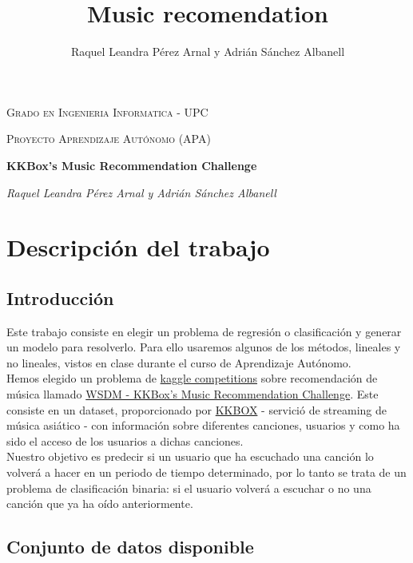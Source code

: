 \documentclass[a4paper]{article}
\title{Music recomendation}
\author{Raquel Leandra Pérez Arnal y Adrián Sánchez Albanell}
\date{} %
\begin{document}
\begin{titlepage}
	\centering
	{\scshape\LARGE Grado en Ingenieria Informatica - UPC \par}
	\vspace{1cm}
	{\scshape\Large Proyecto Aprendizaje Autónomo (APA)\par}
	\vspace{1.5cm}
	{\huge\bfseries KKBox's Music Recommendation Challenge\par}
	\vspace{2cm}
	{\Large\itshape Raquel Leandra Pérez Arnal y Adrián Sánchez Albanell\par}
\end{titlepage}
\clearpage
{\hypersetup{linkcolor=black}
\tableofcontents
}
\cleardoublepage

\section{Descripción del trabajo}


\subsection{Introducción}

Este trabajo consiste en elegir un problema de regresión o clasificación y generar un modelo para resolverlo. Para ello usaremos algunos de los métodos, lineales y no lineales, vistos en clase durante el curso de Aprendizaje Autónomo.\\

Hemos elegido un problema de \href{https://www.kaggle.com/competitions}{kaggle competitions} sobre recomendación de música llamado \href{https://www.kaggle.com/c/kkbox-music-recommendation-challenge}{WSDM - KKBox's Music Recommendation Challenge}. Este consiste en un dataset, proporcionado por \href{https://www.kkbox.com/intl/index.php?area=intl}{KKBOX} - servició de streaming de música asiático - con información sobre diferentes canciones, usuarios y como ha sido el acceso de los usuarios a dichas canciones.\\

Nuestro objetivo es predecir si un usuario que ha escuchado una canción lo volverá a hacer en un periodo de tiempo determinado, por lo tanto se trata de un problema de clasificación binaria: si el usuario volverá a escuchar o no una canción que ya ha oído anteriormente.


\subsection{Conjunto de datos disponible}
\end{document}
